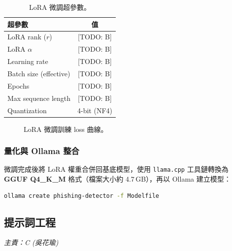\documentclass[11pt, a4paper]{article}
\begin{document}
\begin{table}[h]
  \centering
  \small
  \begin{tabular}{lc}
    \toprule
    \textbf{超參數} & \textbf{值} \\
    \midrule
    LoRA rank ($r$)              & [TODO: B] \\
    LoRA $\alpha$                & [TODO: B] \\
    Learning rate                & [TODO: B] \\
    Batch size (effective)       & [TODO: B] \\
    Epochs                       & [TODO: B] \\
    Max sequence length          & [TODO: B] \\
    Quantization                 & 4-bit (NF4) \\
    \bottomrule
  \end{tabular}
  \caption{LoRA 微調超參數。}
  \label{tab:hyper}
\end{table}

\begin{figure}[h]
  \centering
  \caption{LoRA 微調訓練 loss 曲線。}
\end{figure}

\subsubsection{量化與 Ollama 整合}
微調完成後將 LoRA 權重合併回基底模型，使用 \texttt{llama.cpp} 工具鏈轉換為 \textbf{GGUF Q4\_K\_M} 格式（檔案大小約 4.7\,GB），再以 Ollama 建立模型：

\begin{lstlisting}[language=bash]
ollama create phishing-detector -f Modelfile
\end{lstlisting}

\subsection{提示詞工程} \label{sec:cprompt}
\textit{主責：C (吳花瑜)}

\end{document}
